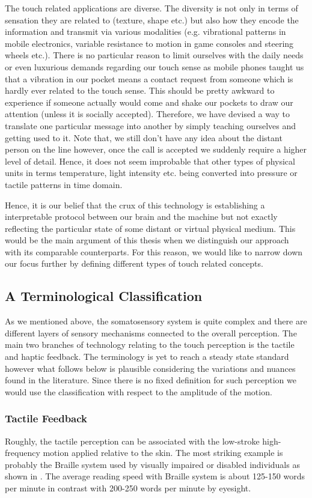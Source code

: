 The touch related applications are diverse. The diversity is not only in terms of sensation they are related to (texture, shape etc.) but also how they encode the information and transmit via various modalities (e.g. vibrational patterns in mobile electronics, variable resistance to motion in game consoles and steering wheels etc.). There is no particular reason to limit ourselves with the daily needs or even luxurious demands regarding our touch sense as mobile phones taught us that a vibration in our pocket means a contact request from someone which is hardly ever related to the touch sense. This should be pretty awkward to experience if someone actually would come and shake our pockets to draw our attention (unless it is socially accepted). Therefore, we have devised a way to translate one particular message into another by simply teaching ourselves and getting used to it. Note that, we still don't have any idea about the distant person on the line however, once the call is accepted we suddenly require a higher level of detail. Hence, it does not seem improbable that other types of physical units in terms temperature, light intensity etc. being converted into pressure or tactile patterns in time domain.

Hence, it is our belief that the crux of this technology is establishing a interpretable protocol between our brain and the machine but not exactly reflecting the particular state of some distant or virtual physical medium. 
This would be the main argument of this thesis when we distinguish our approach with its comparable counterparts. For this reason, we would like to narrow down our focus further by defining different types of touch related concepts.

\subsection{A Terminological Classification}

As we mentioned above, the somatosensory system is quite complex and there are different layers of sensory mechanisms connected to the overall perception. The main two branches of technology relating to the touch perception is the tactile and haptic feedback. The terminology is yet to reach a steady state standard however what follows below is plausible considering the variations and nuances found in the literature. Since there is no fixed definition for such perception we would use the classification with respect to the amplitude of the motion. 
\subsubsection{Tactile Feedback}
Roughly, the tactile perception can be associated with the low-stroke high-frequency motion applied relative to the skin. The most striking example is probably the Braille system used by visually impaired or disabled individuals as shown in . The average reading speed with Braille system is about 125-150 words per minute \cite{americanblind} in contrast with 200-250 words per minute by eyesight. 

